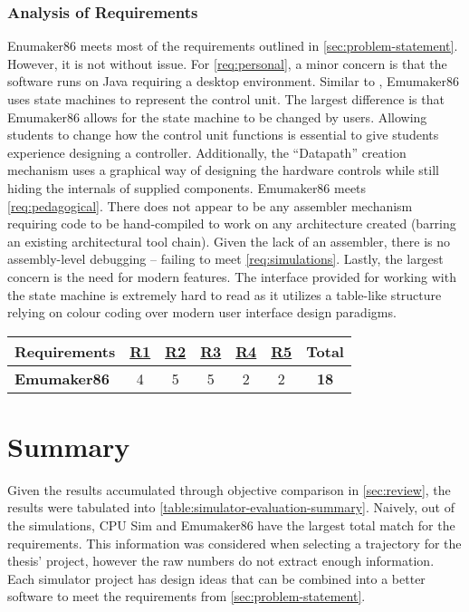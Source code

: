 \subsubsection*{Analysis of Requirements}

Enumaker86 meets most of the requirements outlined in \cref{sec:problem-statement}. However, it is not without issue. For \cref{req:personal}, a minor concern is that the software runs on Java requiring a desktop environment. Similar to \cite{McLoughlin2010,Nakamura2013}, Emumaker86 uses state machines to represent the control unit. The largest difference is that Emumaker86 allows for the state machine to be changed by users. Allowing students to change how the control unit functions is essential to give students experience designing a controller. Additionally, the ``Datapath'' creation mechanism uses a graphical way of designing the hardware controls while still hiding the internals of supplied components. Emumaker86 meets \cref{req:pedagogical}. There does not appear to be any assembler mechanism requiring code to be hand-compiled to work on any architecture created (barring an existing architectural tool chain). Given the lack of an assembler, there is no assembly-level debugging -- failing to meet \cref{req:simulations}. Lastly, the largest concern is the need for modern features. The interface provided for working with the state machine is extremely hard to read as it utilizes a table-like structure relying on colour coding over modern user interface design paradigms.

\begin{table}[h!]
    \centering
    \begin{tabular}{lcccccc}
        \textbf{Requirements} & \textbf{\hyperref[req:personal]{R1}} & \textbf{\hyperref[req:configuration]{R2}} & \textbf{\hyperref[req:pedagogical]{R3}} & \textbf{\hyperref[req:simulations]{R4}} & \textbf{\hyperref[req:modern]{R5}} & \textbf{Total} \\ \hline
        \textbf{Emumaker86 \cite{Black2013}}
        & 4 & 5 & 5 & 2 & 2 & \textbf{18} \\ 
    \end{tabular}
\end{table}

\section{Summary}
\label{sec:review-summary}

Given the results accumulated through objective comparison in \cref{sec:review}, the results were tabulated into \cref{table:simulator-evaluation-summary}. Naively, out of the simulations, CPU Sim \cite{Skrien2001,Skrien2017} and Emumaker86 \cite{Black2013} have the largest total match for the requirements. This information was considered when selecting a trajectory for the thesis' project, however the raw numbers do not extract enough information. Each simulator project has design ideas that can be combined into a better software to meet the requirements from \cref{sec:problem-statement}. 

